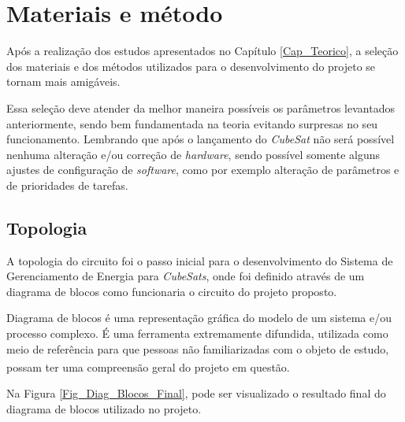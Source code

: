 \documentclass[
	12pt,				%
	openright,			%
	oneside,			%
	a4paper,			%
	english,			%
	french,				%
	spanish,			%
	brazil,				%
	oldfontcommands
	]{abntex2}
\begin{document}
\chapter[Materiais e método]{Materiais e método}

	Após a realização dos estudos apresentados no Capítulo \ref{Cap_Teorico}, a seleção dos materiais e dos métodos utilizados para o desenvolvimento do projeto se tornam mais amigáveis. 
	
	Essa seleção deve atender da melhor maneira possíveis os parâmetros levantados anteriormente, sendo bem fundamentada na teoria evitando surpresas no seu funcionamento. Lembrando que após o lançamento do \textit{CubeSat} não será possível nenhuma alteração e/ou correção de \textit{hardware}, sendo possível somente alguns ajustes de configuração de \textit{software}, como por exemplo alteração de parâmetros e de prioridades de tarefas.
	
\section[Topologia]{Topologia}

	A topologia do circuito foi o passo inicial para o desenvolvimento do Sistema de Gerenciamento de Energia para \textit{CubeSats}, onde foi definido através de um diagrama de blocos como funcionaria o circuito do projeto proposto.
	
	Diagrama de blocos é uma representação gráfica do modelo de um sistema e/ou processo complexo. É uma ferramenta extremamente difundida, utilizada como meio de referência para que pessoas não familiarizadas com o objeto de estudo, possam ter uma compreensão geral do projeto em questão.\textsuperscript{\cite{Diag_Blocos}}	
		
	Na Figura \ref{Fig_Diag_Blocos_Final}, pode ser visualizado o resultado final do diagrama de blocos utilizado no projeto.
	
\end{document}
